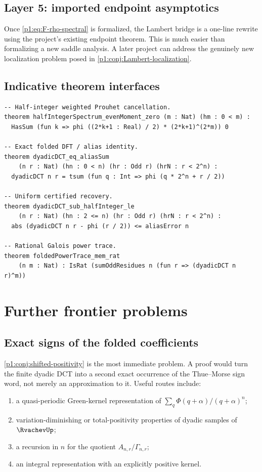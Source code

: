 \documentclass[11pt,oneside]{article}
\theoremstyle{definition}
\theoremstyle{remark}
\newcommand{\PhiU}{\Phi}
\begin{document}
\subsection{Layer 5: imported endpoint asymptotics}

Once \eqref{p1:eq:F-rho-spectral} is formalized, the Lambert bridge is a one-line
rewrite using the project's existing endpoint theorem.  This is much easier than
formalizing a new saddle analysis.  A later project can address the genuinely
new localization problem posed in \cref{p1:conj:Lambert-localization}.

\subsection{Indicative theorem interfaces}

\begin{lstlisting}[style=pseudo,caption={Schematic Lean theorem signatures.}]
-- Half-integer weighted Prouhet cancellation.
theorem halfIntegerSpectrum_evenMoment_zero (m : Nat) (hm : 0 < m) :
  HasSum (fun k => phi ((2*k+1 : Real) / 2) * (2*k+1)^(2*m)) 0

-- Exact folded DFT / alias identity.
theorem dyadicDCT_eq_aliasSum
    (n r : Nat) (hn : 0 < n) (hr : Odd r) (hrN : r < 2^n) :
  dyadicDCT n r = tsum (fun q : Int => phi (q * 2^n + r / 2))

-- Uniform certified recovery.
theorem dyadicDCT_sub_halfInteger_le
    (n r : Nat) (hn : 2 <= n) (hr : Odd r) (hrN : r < 2^n) :
  abs (dyadicDCT n r - phi (r / 2)) <= aliasError n

-- Rational Galois power trace.
theorem foldedPowerTrace_mem_rat
    (n m : Nat) : IsRat (sumOddResidues n (fun r => (dyadicDCT n r)^m))
\end{lstlisting}

\section{Further frontier problems}\label{p1:sec:open}

\subsection{Exact signs of the folded coefficients}

\cref{p1:conj:shifted-positivity} is the most immediate problem.  A proof would
turn the finite dyadic DCT into a second exact occurrence of the Thue--Morse sign
word, not merely an approximation to it.  Useful routes include:
\begin{enumerate}
 \item a quasi-periodic Green-kernel representation of
 $\sum_q\PhiU(q+\alpha)/(q+\alpha)^n$;
 \item variation-diminishing or total-positivity properties of dyadic samples of
 $\RvachevUp$;
 \item a recursion in $n$ for the quotient $A_{n,r}/\Gamma_{n,r}$;
 \item an integral representation with an explicitly positive kernel.
\end{enumerate}
\end{document}
